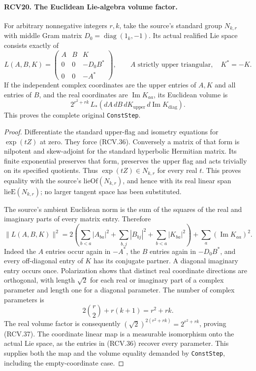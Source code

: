 \documentclass[11pt,a4paper]{article}
\numberwithin{equation}{section}
\theoremstyle{remark}\newtheorem{remark}[theorem]{Remark}
\begin{document}
\paragraph{RCV20. The Euclidean Lie-algebra volume factor.}
\label{claim:RCV20}
For arbitrary nonnegative integers \(r,k\), take the source's
standard group \(N_{k,r}\) with middle Gram matrix
\(D_0=\operatorname{diag}(1_k,-1)\).  Its actual realified
Lie space consists exactly of
\[
 L(A,B,K)=
 \begin{pmatrix}
 A&B&K\\ 0&0&-D_0B^*\\0&0&-A^*
 \end{pmatrix},\qquad
 A\text{ strictly upper triangular},\quad K^*=-K.
\tag{RCV.36}
\]
If the independent complex coordinates are the upper entries of
\(A,K\) and all entries of \(B\), and the real coordinates
are \(\operatorname{Im}K_{aa}\), its Euclidean volume is
\[
        2^{r^2+rk}\,L_*\!\left(dA\,dB\,dK_{\mathrm{upper}}
                                      \,d\operatorname{Im}K_{\mathrm{diag}}\right).
\tag{RCV.37}
\]
This proves the complete original \texttt{Const\allowbreak Step}.
\begin{proof}
Differentiate the standard upper-flag and isometry equations for
\(\exp(tZ)\) at zero.  They force (RCV.36).  Conversely a matrix
of that form is nilpotent and skew-adjoint for the standard
hyperbolic Hermitian matrix.  Its finite exponential preserves
that form, preserves the upper flag and acts trivially on its
specified quotients.  Thus \(\exp(tZ)\in N_{k,r}\) for every
real \(t\).  This proves equality with the source's
\(\mathrm{lieOf}(N_{k,r})\), and hence with its real linear
span \(\mathrm{lieE}(N_{k,r})\); no larger tangent space has
been substituted.

The source's ambient Euclidean norm is the sum of the squares of
the real and imaginary parts of every matrix entry.  Therefore
\[
 \|L(A,B,K)\|^2
  =2\left(\sum_{b<a}|A_{ba}|^2+
           \sum_{b,j}|B_{bj}|^2+
           \sum_{b<a}|K_{ba}|^2\right)
                          +\sum_a(\operatorname{Im}K_{aa})^2.
\tag{RCV.38}
\]
Indeed the \(A\) entries occur again in \(-A^*\), the \(B\)
entries again in \(-D_0B^*\), and every off-diagonal entry of
\(K\) has its conjugate partner.  A diagonal imaginary entry
occurs once.  Polarization shows that distinct real coordinate
directions are orthogonal, with length \(\sqrt2\) for each
real or imaginary part of a complex parameter and length one
for a diagonal parameter.  The number of complex parameters is
\[
              2\binom r2+r(k+1)=r^2+rk.
\]
The real volume factor is consequently
\((\sqrt2)^{2(r^2+rk)}=2^{r^2+rk}\), proving (RCV.37).
The coordinate linear map is a measurable isomorphism onto the
actual Lie space, as the entries in (RCV.36) recover every parameter.
This supplies both the map and the volume equality demanded by
\texttt{Const\allowbreak Step}, including the empty-coordinate case.
\end{proof}
\end{document}
